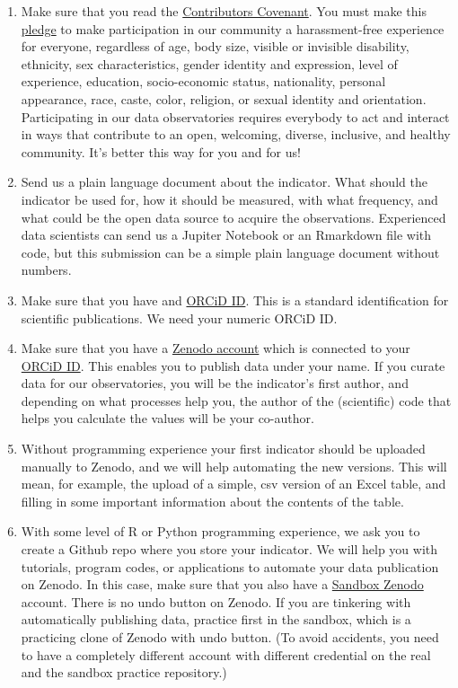 \documentclass[
  a4paper,
  openany, a4paper, oneside]{book}
\begin{document}
\begin{enumerate}
\def\labelenumi{\arabic{enumi}.}
\item
  Make sure that you read the \href{https://www.contributor-covenant.org/}{Contributors Covenant}. You must make this \href{https://www.contributor-covenant.org/version/2/0/code_of_conduct/}{pledge} to make participation in our community a harassment-free experience for everyone, regardless of age, body size, visible or invisible disability, ethnicity, sex characteristics, gender identity and expression, level of experience, education, socio-economic status, nationality, personal appearance, race, caste, color, religion, or sexual identity and orientation. Participating in our data observatories requires everybody to act and interact in ways that contribute to an open, welcoming, diverse, inclusive, and healthy community. It's better this way for you and for us!
\item
  Send us a plain language document about the indicator. What should the indicator be used for, how it should be measured, with what frequency, and what could be the open data source to acquire the observations. Experienced data scientists can send us a Jupiter Notebook or an Rmarkdown file with code, but this submission can be a simple plain language document without numbers.
\item
  Make sure that you have and \href{https://orcid.org/}{ORCiD ID}. This is a standard identification for scientific publications. We need your numeric ORCiD ID.
\item
  Make sure that you have a \href{https://zenodo.org/}{Zenodo account} which is connected to your \href{https://orcid.org/}{ORCiD ID}. This enables you to publish data under your name. If you curate data for our observatories, you will be the indicator's first author, and depending on what processes help you, the author of the (scientific) code that helps you calculate the values will be your co-author.
\item
  Without programming experience your first indicator should be uploaded manually to Zenodo, and we will help automating the new versions. This will mean, for example, the upload of a simple, csv version of an Excel table, and filling in some important information about the contents of the table.
\item
  With some level of R or Python programming experience, we ask you to create a Github repo where you store your indicator. We will help you with tutorials, program codes, or applications to automate your data publication on Zenodo. In this case, make sure that you also have a \href{https://sandbox.zenodo.org/}{Sandbox Zenodo} account. There is no undo button on Zenodo. If you are tinkering with automatically publishing data, practice first in the sandbox, which is a practicing clone of Zenodo with undo button. (To avoid accidents, you need to have a completely different account with different credential on the real and the sandbox practice repository.)

\end{enumerate}
\end{document}
